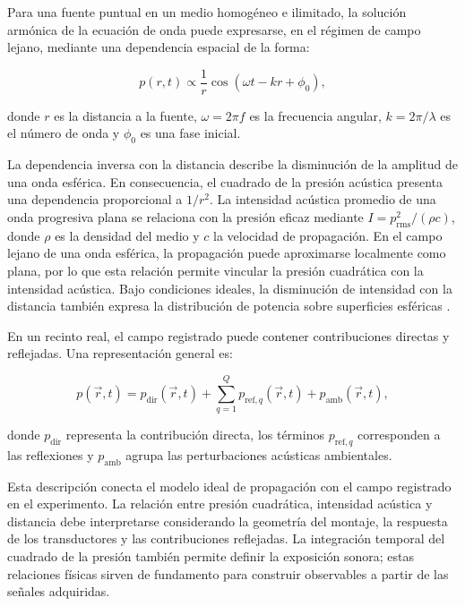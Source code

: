 Para una fuente puntual en un medio homogéneo e ilimitado, la solución
armónica de la ecuación de onda puede expresarse, en el régimen de campo
lejano, mediante una dependencia espacial de la forma:

\begin{equation}
    p(r,t)
    \propto
    \frac{1}{r}
    \cos(\omega t-kr+\phi_0),
    \label{eq:onda_esferica}
\end{equation}

donde $r$ es la distancia a la fuente, $\omega=2\pi f$ es la frecuencia
angular, $k=2\pi/\lambda$ es el número de onda y $\phi_0$ es una fase
inicial.

La dependencia inversa con la distancia describe la disminución de la
amplitud de una onda esférica. En consecuencia, el cuadrado de la
presión acústica presenta una dependencia proporcional a $1/r^2$.
La intensidad acústica promedio de una onda progresiva plana se
relaciona con la presión eficaz mediante
$I=p_{\mathrm{rms}}^2/(\rho c)$, donde $\rho$ es la densidad del
medio y $c$ la velocidad de propagación. En el campo lejano de una
onda esférica, la propagación puede aproximarse localmente como plana,
por lo que esta relación permite vincular la presión cuadrática con
la intensidad acústica. Bajo condiciones ideales, la disminución de
intensidad con la distancia también expresa la distribución de potencia
sobre superficies esféricas
\cite{kinsler2000fundamentals,pierce1989acoustics}.

En un recinto real, el campo registrado puede contener contribuciones
directas y reflejadas. Una representación general es:

\begin{equation}
    p(\vec{r},t)
    =
    p_{\mathrm{dir}}(\vec{r},t)
    +
    \sum_{q=1}^{Q}
    p_{\mathrm{ref},q}(\vec{r},t)
    +
    p_{\mathrm{amb}}(\vec{r},t),
    \label{eq:campo_multitrayecto}
\end{equation}

donde $p_{\mathrm{dir}}$ representa la contribución directa, los términos
$p_{\mathrm{ref},q}$ corresponden a las reflexiones y
$p_{\mathrm{amb}}$ agrupa las perturbaciones acústicas ambientales.

Esta descripción conecta el modelo ideal de propagación con el campo
registrado en el experimento. La relación entre presión cuadrática,
intensidad acústica y distancia debe interpretarse considerando la
geometría del montaje, la respuesta de los transductores y las
contribuciones reflejadas. La integración temporal del cuadrado de la
presión también permite definir la exposición sonora; estas relaciones
físicas sirven de fundamento para construir observables a partir de las
señales adquiridas.

